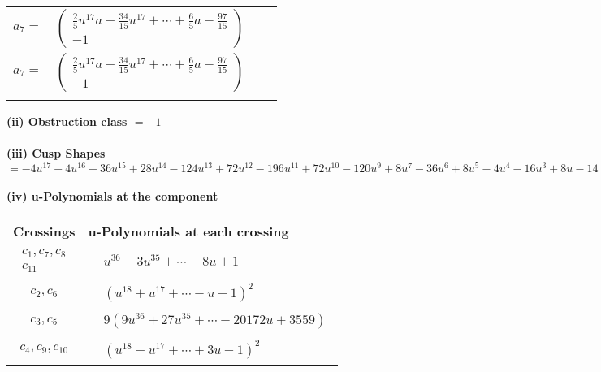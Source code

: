 \documentclass[1p]{elsarticle_modified}
\theoremstyle{definition}
\begin{document}
\begin{tabular}{m{7pt} m{180pt} m{7pt} m{180pt} }
\flushright $a_{7}=$&$\begin{pmatrix}\frac{2}{5} u^{17} a-\frac{34}{15} u^{17}+\cdots+\frac{6}{5} a-\frac{97}{15}\\-1\end{pmatrix}$\\ \flushright $a_{7}=$&$\begin{pmatrix}\frac{2}{5} u^{17} a-\frac{34}{15} u^{17}+\cdots+\frac{6}{5} a-\frac{97}{15}\\-1\end{pmatrix}$\\&\end{tabular}
\flushleft \textbf{(ii) Obstruction class $= -1$}\\~\\
\flushleft \textbf{(iii) Cusp Shapes $= -4 u^{17}+4 u^{16}-36 u^{15}+28 u^{14}-124 u^{13}+72 u^{12}-196 u^{11}+72 u^{10}-120 u^9+8 u^7-36 u^6+8 u^5-4 u^4-16 u^3+8 u-14$}\\~\\
\newpage\renewcommand{\arraystretch}{1}
\flushleft \textbf{(iv) u-Polynomials at the component}\newline \\
\begin{tabular}{m{50pt}|m{274pt}}
Crossings & \hspace{64pt}u-Polynomials at each crossing \\
\hline $$\begin{aligned}c_{1},c_{7},c_{8}\\c_{11}\end{aligned}$$&$\begin{aligned}
&u^{36}-3 u^{35}+\cdots-8 u+1
\end{aligned}$\\
\hline $$\begin{aligned}c_{2},c_{6}\end{aligned}$$&$\begin{aligned}
&(u^{18}+u^{17}+\cdots- u-1)^{2}
\end{aligned}$\\
\hline $$\begin{aligned}c_{3},c_{5}\end{aligned}$$&$\begin{aligned}
&9(9 u^{36}+27 u^{35}+\cdots-20172 u+3559)
\end{aligned}$\\
\hline $$\begin{aligned}c_{4},c_{9},c_{10}\end{aligned}$$&$\begin{aligned}
&(u^{18}- u^{17}+\cdots+3 u-1)^{2}
\end{aligned}$\\
\hline
\end{tabular}\\~\\
\end{document}

